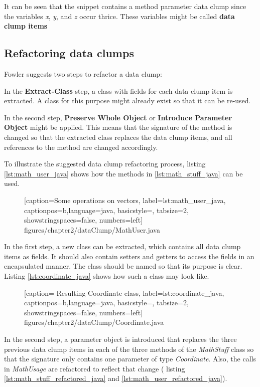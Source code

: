 It can be seen that  the snippet contains a method parameter data clump since the variables \textit{x}, \textit{y}, and  \textit{z} occur thrice.  These variables might be called \textbf{data clump items}
  
\subsection{Refactoring data clumps}
Fowler suggests two  steps to refactor a data clump:

In the  \textbf{Extract-Class}-step, a class with fields for each data clump item is extracted. A class for this purpose might already exist so that it can be re-used.

In the second step, \textbf{Preserve Whole Object} or \textbf{Introduce Parameter Object} might be applied. This means that the signature of the method is changed so that the extracted class replaces the data clump items, and all references to the method are changed accordingly.


To illustrate the suggested data clump refactoring process, listing \ref{lst:math_user_java} shows how the methods in \ref{lst:math_stuff_java} can be used. 


  \begin{figure} [htbp!]
			
			[caption={Some operations on vectors},
			label={lst:math_user_java},
			captionpos=b,language=java, basicstyle=\footnotesize, tabsize=2, showstringspaces=false,  numbers=left]
			{figures/chapter2/dataClump/MathUser.java}
	\end{figure}

In the first step, a new class can be extracted, which contains all data clump items as fields. It should also contain setters and getters to access the fields in an encapsulated manner. The class should be named so that its purpose is clear. Listing \ref{lst:coordinate_java} shows how such a class may look like. 

  \begin{figure} [htbp!]
			
			[caption={ Resulting Coordinate class},
			label={lst:coordinate_java},
			captionpos=b,language=java, basicstyle=\footnotesize, tabsize=2, showstringspaces=false,  numbers=left]
			{figures/chapter2/dataClump/Coordinate.java}
		\end{figure}

In the second step, a parameter object is introduced that replaces the three previous data clump items in each of the three methods of the \textit{MathStuff} class so that the signature only contains one parameter of type \textit{Coordinate}. Also, the calls in \textit{MathUsage} are refactored to reflect that change ( listing \ref{lst:math_stuff_refactored_java} and \ref{lst:math_user_refactored_java}). 

